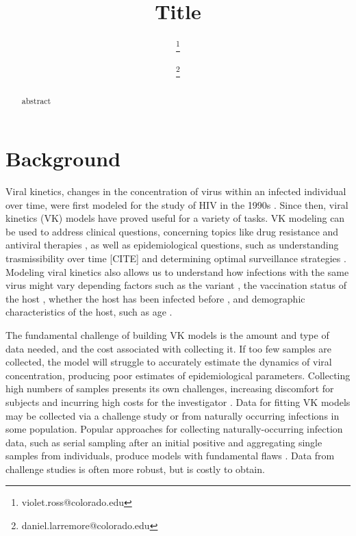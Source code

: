 \documentclass[11pt,notitlepage]{article}
\begin{document}
\author[1]{\thanks{violet.ross@colorado.edu}}
\author[1,2,3]{\thanks{daniel.larremore@colorado.edu}}
\date{}
\title{Title}
\maketitle
\begin{abstract}
abstract
\end{abstract}



\section{Background}
\label{sec-intro}


Viral kinetics, changes in the concentration of virus within an infected individual over time, were first modeled for the study of HIV in the 1990s \cite{perelson1996hiv}.
Since then, viral kinetics (VK) models have proved useful for a variety of tasks.
VK modeling can be used to address clinical questions, concerning topics like drug resistance \cite{rong2012modeling} and antiviral therapies \cite{heldt2013multiscale}, as well as epidemiological questions, such as understanding trasmissibility over time [CITE] and determining optimal surveillance strategies \cite{kissler2021viral}.  
Modeling viral kinetics also allows us to understand how infections with the same virus might vary depending factors such as the variant \cite{russell2024combined}, the vaccination status of the host \cite{ke2022longitudinal}, whether the host has been infected before \cite{kissler2023viral}, and demographic characteristics of the host, such as age \cite{russell2024combined}.

The fundamental challenge of building VK models is the amount and type of data needed, and the cost associated with collecting it.
If too few samples are collected, the model will struggle to accurately estimate the dynamics of viral concentration, producing poor estimates of epidemiological parameters.
Collecting high numbers of samples presents its own challenges, increasing discomfort for subjects and incurring high costs for the investigator \cite{canini2011viral}. 
Data for fitting VK models may be collected via a challenge study or from naturally occurring infections in some population.
Popular approaches for collecting naturally-occurring infection data, such as serial sampling after an initial positive and aggregating single samples from individuals, produce models with fundamental flaws \cite{russell2024combined}.
Data from challenge studies is often more robust, but is costly to obtain.
\end{document}
